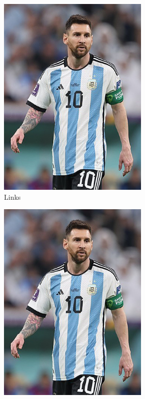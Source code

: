 \begin{figure}[H]
    \centering

    \begin{subfigure}{0.5\textwidth}
        \centering
        \includegraphics[width=0.8\textwidth]{contents/03_Drittes_Kapitel/Messi}
        \caption{Links}
        \label{fig:messi_2_1}
    \end{subfigure}%
    \begin{subfigure}{0.5\textwidth}
        \centering
        \includegraphics[width=0.8\textwidth]{contents/03_Drittes_Kapitel/Messi}

\end{subfigure}
\end{figure}
